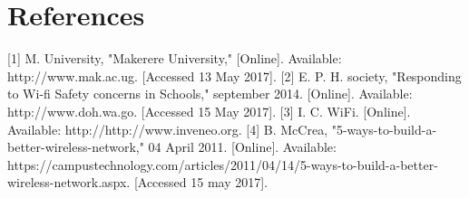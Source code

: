 ﻿\documentclass[10]{article}
\begin{document}
\section{References}


[1]	M. University, "Makerere University," [Online]. Available: http://www.mak.ac.ug. [Accessed 13 May 2017].
[2] 	E. P. H. society, "Responding to Wi-fi Safety concerns in Schools," september 2014. [Online]. Available: http://www.doh.wa.go. [Accessed 15 May 2017].
[3] 	I. C. WiFi. [Online]. Available: http://http://www.inveneo.org.
[4] 	B. McCrea, "5-ways-to-build-a-better-wireless-network," 04 April 2011. [Online]. Available: https://campustechnology.com/articles/2011/04/14/5-ways-to-build-a-better-wireless-network.aspx. [Accessed 15 may 2017].
\end{document}
